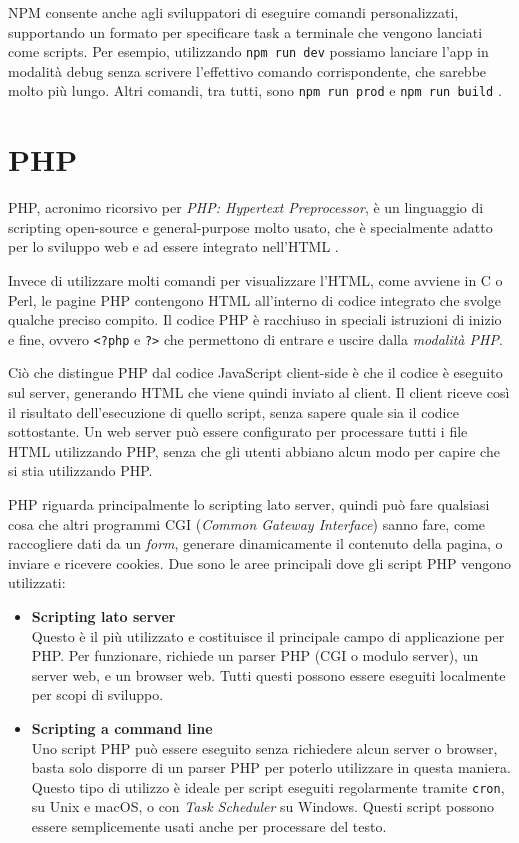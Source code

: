 NPM consente anche agli sviluppatori di eseguire comandi personalizzati, supportando un formato per specificare task a terminale che vengono lanciati come scripts. Per esempio, utilizzando \Verb_npm run dev_ possiamo lanciare l'app in modalità debug senza scrivere l'effettivo comando corrispondente, che sarebbe molto più lungo. Altri comandi, tra tutti, sono \Verb_npm run prod_ e \Verb_npm run build_ \cite{NPM_Package_Manager}.

\section{PHP}
PHP, acronimo ricorsivo per \textit{PHP: Hypertext Preprocessor}, è un linguaggio di scripting open-source e general-purpose molto usato, che è specialmente adatto per lo sviluppo web e ad essere integrato nell'HTML \cite{PHP, PHP_Docs}.

Invece di utilizzare molti comandi per visualizzare l'HTML, come avviene in C o Perl, le pagine PHP contengono HTML all'interno di codice integrato che svolge qualche preciso compito. Il codice PHP è racchiuso in speciali istruzioni di inizio e fine, ovvero \Verb_<?php_ e \Verb_?>_ che permettono di entrare e uscire dalla \textit{modalità PHP}.

Ciò che distingue PHP dal codice JavaScript client-side è che il codice è eseguito sul server, generando HTML che viene quindi inviato al client. Il client riceve così il risultato dell'esecuzione di quello script, senza sapere quale sia il codice sottostante. Un web server può essere configurato per processare tutti i file HTML utilizzando PHP, senza che gli utenti abbiano alcun modo per capire che si stia utilizzando PHP.

PHP riguarda principalmente lo scripting lato server, quindi può fare qualsiasi cosa che altri programmi CGI (\textit{Common Gateway Interface}) sanno fare, come raccogliere dati da un \textit{form}, generare dinamicamente il contenuto della pagina, o inviare e ricevere cookies. Due sono le aree principali dove gli script PHP vengono utilizzati:
\begin{itemize}
    \item \textbf{Scripting lato server}\\
    Questo è il più utilizzato e costituisce il principale campo di applicazione per PHP. Per funzionare, richiede un parser PHP (CGI o modulo server), un server web, e un browser web. Tutti questi possono essere eseguiti localmente per scopi di sviluppo.
    \item \textbf{Scripting a command line}\\
    Uno script PHP può essere eseguito senza richiedere alcun server o browser, basta solo disporre di un parser PHP per poterlo utilizzare in questa maniera. Questo tipo di utilizzo è ideale per script eseguiti regolarmente tramite \Verb_cron_, su Unix e macOS, o con \textit{Task Scheduler} su Windows. Questi script possono essere semplicemente usati anche per processare del testo.
\end{itemize}

